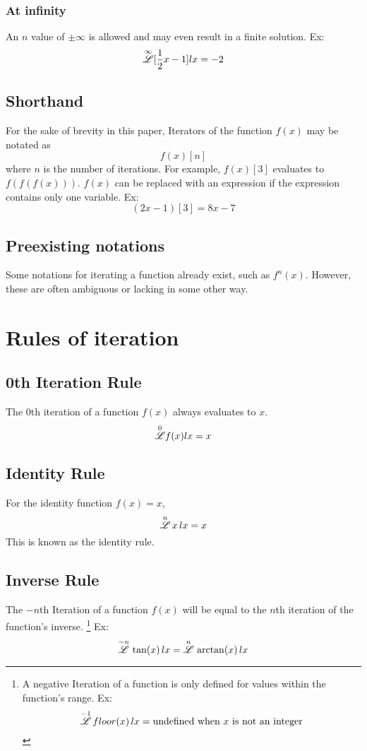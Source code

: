 \documentclass[12pt, letterpaper]{article}
\begin{document}
\subsubsection{At infinity}
An $n$ value of $\pm\infty$ is allowed and may even result in a finite solution. Ex:
$$\overset{\infty}{\mathscr{L}} [\frac{1}{2}x - 1] lx = -2$$

\subsection{Shorthand}
For the sake of brevity in this paper, Iterators of the function $f(x)$ may be notated as
$$f(x)[n]$$ 
where $n$ is the number of iterations. For example, $f(x)[3]$ evaluates to $f(f(f(x)))$. $f(x)$ can be replaced with an expression if the expression contains only one variable. Ex:
$$(2x-1)[3] = 8x-7$$

\subsection{Preexisting notations}
Some notations for iterating a function already exist, such as $f^n(x)$. However, these are often ambiguous or lacking in some other way.

\section{Rules of iteration}

\subsection{0th Iteration Rule}
The 0th iteration of a function $f(x)$ always evaluates to $x$.
$$\overset{0}{\mathscr{L}}f(x)lx = x$$

\subsection{Identity Rule}
For the identity function $f(x) = x$, 
\[
\overset{n}{\mathscr{L}} \, x \, lx = x
\]
This is known as the identity rule.

\subsection{Inverse Rule}
The $-n$th Iteration of a function $f(x)$ will be equal to the $n$th iteration of the function's inverse.
\footnote{A negative Iteration of a function is only defined for values within the function's range. Ex:$$\overset{-1}{\mathscr{L}} \, floor(x) \, lx = \text{undefined when $x$ is not an integer}$$}
Ex:
\[
\overset{-n}{\mathscr{L}} \, \tan(x) \, lx = \overset{n}{\mathscr{L}} \, \arctan(x) \, lx
\]
\newpage
\end{document}
